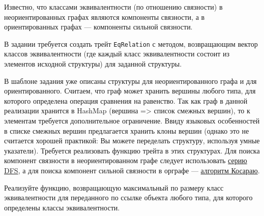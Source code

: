 \documentclass[a4paper, 10pt]{extarticle}
\begin{document}
\begin{tsk}
    Известно, что классами эквивалентности (по отношению связности) в неориентированных графах являются компоненты связности, а в ориентированных графах --- компоненты сильной связности.

    В задании требуется создать трейт \verb|EqRelation| с методом, возвращающим вектор классов эквивалентности (где каждый класс эквивалентности состоит из элементов исходной структуры) для заданной структуры.

    В шаблоне задания уже описаны структуры для неориентированного графа и для ориентированного. Считаем, что граф может хранить вершины любого типа, для которого определена операция сравнения на равенство. Так как граф в данной реализации хранится в HashMap (вершина => список смежных вершин), то к элементам требуется дополнительное ограничение. Ввиду языковых особенностей в списке смежных вершин предлагается хранить клоны вершин (однако это не считается хорошей практикой: Вы можете переделать структуру, используя умные указатели). Требуется реализовать функцию трейта в этих структурах. Для поиска компонент связности в неориентированном графе следует использовать \href{http://e-maxx.ru/algo/connected_components}{серию DFS}, а для поиска компонент сильной связности в орграфе --- \href{http://e-maxx.ru/algo/strong_connected_components}{алгоритм Косараю}. 
    
    Реализуйте функцию, возвращающую максимальный по размеру класс эквивалентности для переданного по ссылке объекта любого типа, для которого определены классы эквивалентности.
\end{tsk}
\end{document}
